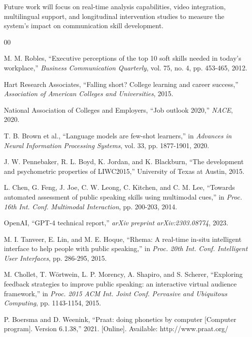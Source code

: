 \documentclass[conference]{IEEEtran}
\begin{document}
Future work will focus on real-time analysis capabilities, video integration, multilingual support, and longitudinal intervention studies to measure the system's impact on communication skill development.



\begin{thebibliography}{00}

 M. M. Robles, ``Executive perceptions of the top 10 soft skills needed in today's workplace,'' \textit{Business Communication Quarterly}, vol. 75, no. 4, pp. 453-465, 2012.

 Hart Research Associates, ``Falling short? College learning and career success,'' \textit{Association of American Colleges and Universities}, 2015.

 National Association of Colleges and Employers, ``Job outlook 2020,'' \textit{NACE}, 2020.

 T. B. Brown et al., ``Language models are few-shot learners,'' in \textit{Advances in Neural Information Processing Systems}, vol. 33, pp. 1877-1901, 2020.

 J. W. Pennebaker, R. L. Boyd, K. Jordan, and K. Blackburn, ``The development and psychometric properties of LIWC2015,'' University of Texas at Austin, 2015.

 L. Chen, G. Feng, J. Joe, C. W. Leong, C. Kitchen, and C. M. Lee, ``Towards automated assessment of public speaking skills using multimodal cues,'' in \textit{Proc. 16th Int. Conf. Multimodal Interaction}, pp. 200-203, 2014.

 OpenAI, ``GPT-4 technical report,'' \textit{arXiv preprint arXiv:2303.08774}, 2023.

 M. I. Tanveer, E. Lin, and M. E. Hoque, ``Rhema: A real-time in-situ intelligent interface to help people with public speaking,'' in \textit{Proc. 20th Int. Conf. Intelligent User Interfaces}, pp. 286-295, 2015.

 M. Chollet, T. Wörtwein, L. P. Morency, A. Shapiro, and S. Scherer, ``Exploring feedback strategies to improve public speaking: an interactive virtual audience framework,'' in \textit{Proc. 2015 ACM Int. Joint Conf. Pervasive and Ubiquitous Computing}, pp. 1143-1154, 2015.

 P. Boersma and D. Weenink, ``Praat: doing phonetics by computer [Computer program]. Version 6.1.38,'' 2021. [Online]. Available: http://www.praat.org/


\end{thebibliography}
\end{document}
